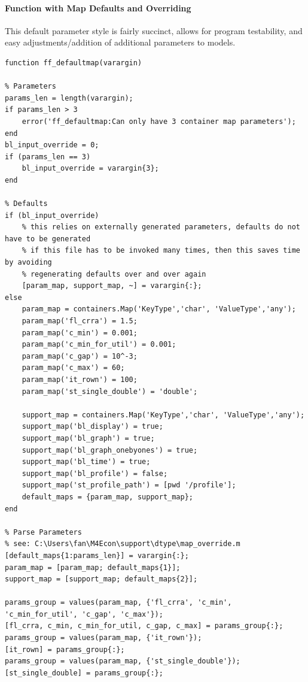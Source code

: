 \documentclass[
]{book}
\begin{document}
\hypertarget{function-with-map-defaults-and-overriding}{%
\paragraph{Function with Map Defaults and Overriding}\label{function-with-map-defaults-and-overriding}}

This default parameter style is fairly succinct, allows for program
testability, and easy adjustments/addition of additional parameters to
models.

\begin{verbatim}
function ff_defaultmap(varargin)

% Parameters
params_len = length(varargin);
if params_len > 3
    error('ff_defaultmap:Can only have 3 container map parameters');
end
bl_input_override = 0;
if (params_len == 3)
    bl_input_override = varargin{3};
end

% Defaults
if (bl_input_override)
    % this relies on externally generated parameters, defaults do not have to be generated
    % if this file has to be invoked many times, then this saves time by avoiding
    % regenerating defaults over and over again
    [param_map, support_map, ~] = varargin{:};
else    
    param_map = containers.Map('KeyType','char', 'ValueType','any');
    param_map('fl_crra') = 1.5;
    param_map('c_min') = 0.001;
    param_map('c_min_for_util') = 0.001;
    param_map('c_gap') = 10^-3;
    param_map('c_max') = 60;
    param_map('it_rown') = 100;
    param_map('st_single_double') = 'double';
    
    support_map = containers.Map('KeyType','char', 'ValueType','any');
    support_map('bl_display') = true;
    support_map('bl_graph') = true;
    support_map('bl_graph_onebyones') = true;
    support_map('bl_time') = true;
    support_map('bl_profile') = false;
    support_map('st_profile_path') = [pwd '/profile'];
    default_maps = {param_map, support_map};
end

% Parse Parameters
% see: C:\Users\fan\M4Econ\support\dtype\map_override.m
[default_maps{1:params_len}] = varargin{:};
param_map = [param_map; default_maps{1}];
support_map = [support_map; default_maps{2}];

params_group = values(param_map, {'fl_crra', 'c_min', 'c_min_for_util', 'c_gap', 'c_max'});
[fl_crra, c_min, c_min_for_util, c_gap, c_max] = params_group{:};
params_group = values(param_map, {'it_rown'});
[it_rown] = params_group{:};
params_group = values(param_map, {'st_single_double'});
[st_single_double] = params_group{:};


\end{verbatim}
\end{document}
